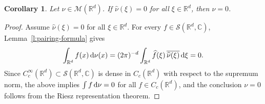 \documentclass[12pt,a4paper,oneside]{amsart}
\theoremstyle{plain}
\newtheorem{corollary}[theorem]{Corollary}
\theoremstyle{definition}
\numberwithin{equation}{section}
\numberwithin{figure}{section}
\numberwithin{table}{section}
\theoremstyle{remark}
\newcommand{\R}{\mathbb{R}}
\newcommand{\dd}{\textup{d}}
\newcommand{\calM}{\mathcal{M}}
\newcommand{\Fhat}[1]{\widehat{#1}}
\begin{document}



\begin{corollary}\label{c:uniqueness}
Let $\nu\in\calM(\R^d)$. If $\Fhat{\nu}(\xi)=0$ for all $\xi\in\R^d$, then $\nu=0$.
\end{corollary}

\begin{proof}
Assume $\Fhat{\nu}(\xi) = 0$ for all $\xi \in \R^d$. For every 
$f \in \mathcal{S}(\R^d,\mathbb{C})$, Lemma~\ref{l:pairing-formula} gives
\begin{equation*}
\int_{\R^d} f(x)\,\dd\nu(x)
= (2\pi)^{-d}\int_{\R^d}\Fhat{f}(\xi)\,\overline{\Fhat{\nu}(\xi)}\,\dd\xi = 0.
\end{equation*}
Since $C^\infty_c(\R^d) \subset \mathcal{S}(\R^d,\mathbb{C})$ is dense in 
$C_c(\R^d)$ with respect to the supremum norm, the above implies 
$\int f\,\dd\nu = 0$ for all $f \in C_c(\R^d)$, and the conclusion 
$\nu = 0$ follows from the Riesz representation theorem.
\end{proof}
\end{document}
